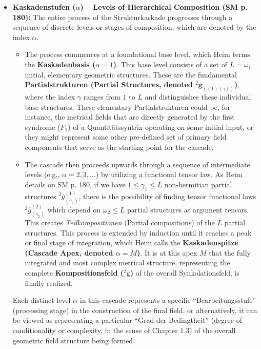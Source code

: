 \documentclass[12pt]{article}
\newcommand{\q}[1]{\enquote{#1}}
\newcommand{\syndrom}{F}
\newcommand{\kompositionsfeld}{{}^2\bar{\mathrm{g}}}
\newcommand{\partialstruktur}[1]{{}^2\mathbf{g}_{(#1)}}
\newcommand{\kaskadenstufe}{\alpha}
\begin{document}
\begin{itemize}
    \item \textbf{Kaskadenstufen (\( \kaskadenstufe \)) – Levels of Hierarchical Composition (SM p. 180):}
    The entire process of the Strukturkaskade progresses through a sequence of discrete levels or stages of composition, which are denoted by the index \( \kaskadenstufe \).
    \begin{itemize}
        \item The process commences at a foundational base level, which Heim terms the \textbf{Kaskadenbasis (\( \kaskadenstufe=1 \))}. This base level consists of a set of \( L = \omega_1 \) initial, elementary geometric structures. These are the fundamental \textbf{Partialstrukturen (Partial Structures, denoted \( \partialstruktur{(1)(\gamma)} \))}, where the index \( \gamma \) ranges from \( 1 \) to \( L \) and distinguishes these individual base structures. These elementary Partialstrukturen could be, for instance, the metrical fields that are directly generated by the first syndrome (\(\syndrom_1\)) of a Quantitätssyntrix operating on some initial input, or they might represent some other pre-defined set of primary field components that serve as the starting point for the cascade.
        \item The cascade then proceeds upwards through a sequence of intermediate levels (e.g., \( \kaskadenstufe = 2, 3, \dots \)) by utilizing a functional tensor law. As Heim details on SM p. 180, if we have $1 \le \gamma_1 \le L$ non-hermitian partial structures $^2\overline{g}_{(\gamma_1)}^{(1)}$, there is the possibility of finding tensor functional laws $^2\overline{g}_{(\gamma_2)}^{(2)}$ which depend on $\omega_2 \le L$ partial structures as argument tensors. This creates \textit{Teilkompositionen} (Partial compositions) of the $L$ partial structures. This process is extended by induction until it reaches a peak or final stage of integration, which Heim calls the \textbf{Kaskadenspitze (Cascade Apex, denoted \( \kaskadenstufe=M \))}. It is at this apex \(M\) that the fully integrated and most complex metrical structure, representing the complete \textbf{Kompositionsfeld (\( \kompositionsfeld \))} of the overall Synkolationsfeld, is finally realized.
    \end{itemize}
    Each distinct level \( \kaskadenstufe \) in this cascade represents a specific \q{Bearbeitungsstufe} (processing stage) in the construction of the final field, or alternatively, it can be viewed as representing a particular \q{Grad der Bedingtheit} (degree of conditionality or complexity, in the sense of Chapter 1.3) of the overall geometric field structure being formed.


\end{itemize}
\end{document}

